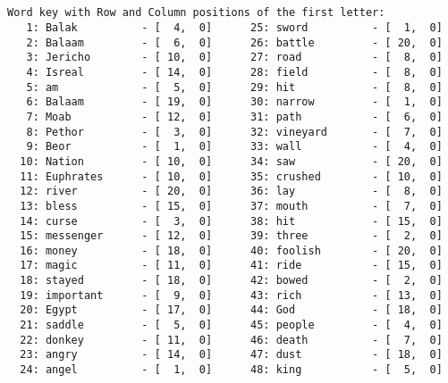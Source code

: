 \documentclass[12pt,a4paper,article]{memoir}\usepackage[]{graphicx}\usepackage[]{color}
\begin{document}
\begin{verbatim}


Word key with Row and Column positions of the first letter:
   1: Balak          - [  4,  0]      25: sword          - [  1,  0]
   2: Balaam         - [  6,  0]      26: battle         - [ 20,  0]
   3: Jericho        - [ 10,  0]      27: road           - [  8,  0]
   4: Isreal         - [ 14,  0]      28: field          - [  8,  0]
   5: am             - [  5,  0]      29: hit            - [  8,  0]
   6: Balaam         - [ 19,  0]      30: narrow         - [  1,  0]
   7: Moab           - [ 12,  0]      31: path           - [  6,  0]
   8: Pethor         - [  3,  0]      32: vineyard       - [  7,  0]
   9: Beor           - [  1,  0]      33: wall           - [  4,  0]
  10: Nation         - [ 10,  0]      34: saw            - [ 20,  0]
  11: Euphrates      - [ 10,  0]      35: crushed        - [ 10,  0]
  12: river          - [ 20,  0]      36: lay            - [  8,  0]
  13: bless          - [ 15,  0]      37: mouth          - [  7,  0]
  14: curse          - [  3,  0]      38: hit            - [ 15,  0]
  15: messenger      - [ 12,  0]      39: three          - [  2,  0]
  16: money          - [ 18,  0]      40: foolish        - [ 20,  0]
  17: magic          - [ 11,  0]      41: ride           - [ 15,  0]
  18: stayed         - [ 18,  0]      42: bowed          - [  2,  0]
  19: important      - [  9,  0]      43: rich           - [ 13,  0]
  20: Egypt          - [ 17,  0]      44: God            - [ 18,  0]
  21: saddle         - [  5,  0]      45: people         - [  4,  0]
  22: donkey         - [ 11,  0]      46: death          - [  7,  0]
  23: angry          - [ 14,  0]      47: dust           - [ 18,  0]
  24: angel          - [  1,  0]      48: king           - [  5,  0]

\end{verbatim}
\clearpage
\end{document}

